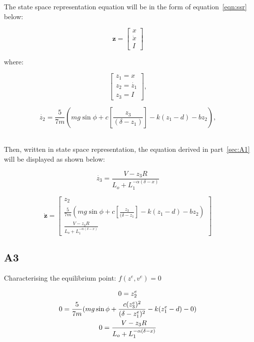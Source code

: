 \documentclass[a4paper,10pt,reqno]{amsart}
\numberwithin{equation}{section}
\begin{document}
\par The state space representation equation will be in the form of equation~\ref{eqn:ssr} below:

\begin{equation}
\label{eqn:ssr}
\bm{z}=
\begin{bmatrix}
x
\\
\dot{x}
\\
I
\end{bmatrix}
\end{equation}

\par where:

\begin{equation}
\begin{bmatrix}
z_1=x
\\
z_2=\dot{z_1}
\\
z_3=I
\end{bmatrix},
\end{equation}

\begin{equation}
    \dot{z_2}=\frac{5}{7m}(mg\sin{\phi}+c[\frac{z_3}{(\delta-z_1)}]-k(z_1-d)-bz_2),
\end{equation}
\\
\par Then, written in state space representation, the equation derived in part~\ref{sec:A1} will be displayed as shown below:

\begin{equation}
    \dot{z_3}=\frac{V-z_3R}{L_o+L_1^{-\alpha(\delta-x)}}
\end{equation}



\begin{equation}
\bm{\dot{z}}=
\begin{bmatrix}
z_2
\\
\frac{5}{7m}(mg\sin{\phi}+c[\frac{z_3}{(\delta-z_1}]-k(z_1-d)-bz_2)
\\
\frac{V-z_3R}{L_o+L_1^{-\alpha(\delta-x)}}
\end{bmatrix}
\end{equation}

\subsection{A3}\label{sec:A3} 

\par Characterising the equilibrium point: $f(z^e,v^e)=0$

\begin{gather}
    0=z_2^e
    \notag\\
    0=\frac{5}{7m}(mg\sin{\phi}+\frac{c(z_3^e)^2}{(\delta-z_1^e)^2}-k(z_1^e-d)-0)
    \notag\\
    0=\frac{V-z_3R}{L_o+L_1^{-\alpha(\delta-x)}}
\end{gather}
\end{document}
